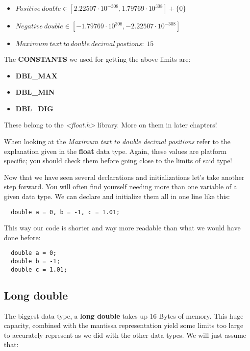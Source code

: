 \documentclass[12pt]{book}
\begin{document}
\begin{itemize}
  \item $Positive\ double \in [2.22507 \cdot 10^{-308}, 1.79769 \cdot 10^{308}] + \{0\}$
  \item $Negative\ double \in [-1.79769 \cdot 10^{308}, -2.22507 \cdot 10^{-308}]$
  \item $Maximum\ text\ to\ double\ decimal\ postions:\ 15$
\end{itemize}

The \textbf{CONSTANTS} we used for getting the above limits are:

\begin{itemize}
  \item \textbf{DBL\_MAX}
  \item \textbf{DBL\_MIN}
  \item \textbf{DBL\_DIG}
\end{itemize}

These belong to the \textit{\textless float.h\textgreater} library. More on them in later chapters!

When looking at the \textit{Maximum text to double decimal positions} refer to the explanation given in the \textbf{float} data type. Again, these values are platform specific; you should check them before going close to the limits of said type!

Now that we have seen several declarations and initializations let's take another step forward. You will often find yourself needing more than one variable of a given data type. We can declare and initialize them all in one line like this:

\begin{verbatim}
  double a = 0, b = -1, c = 1.01;
\end{verbatim}

This way our code is shorter and way more readable than what we would have done before:

\begin{verbatim}
  double a = 0;
  double b = -1;
  double c = 1.01;
\end{verbatim}

\subsection{Long double}

The biggest data type, a \textbf{long double} takes up 16 Bytes of memory. This huge capacity, combined with the mantissa representation yield some limits too large to accurately represent as we did with the other data types. We will just assume that:
\end{document}
